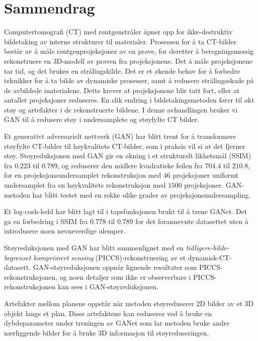 \chapter*{Sammendrag}
Computertomografi (CT) med røntgenstråler åpner opp for ikke-destruktiv bildetaking av interne strukturer til materialer. Prosessen for å ta CT-bilder består av å måle røntgenprojeksjoner av en prøve, for deretter å beregningsmessig rekonstruere en 3D-modell av prøven fra projeksjonene. Det å måle projeksjonene tar tid, og det brukes en strålingskilde. Det er et økende behov for å forbedre teknikker for å ta bilde av dynamiske prosesser, samt å redusere strålingsskade på de avbildede materialene. Dette krever at projeksjonene blir tatt fort, eller at antallet projeksjoner reduseres. En slik endring i bildetakingsmetoden fører til økt støy og artefakter i de rekonstruerte bildene. I denne avhandlingen bruker vi GAN til å redusere støy i undersamplete og støyfylte CT bilder. 

Et generativt adversarielt nettverk (GAN) har blitt trent for å transformere støyfylte CT-bilder til høykvalitets CT-bilder, som i praksis vil si at det fjerner støy. Støyreduksjonen med GAN gir en økning i et strukturelt likhetsmål (SSIM) fra $0.223$ til $0.789$, og reduserer den midlere kvadratiske feilen fra $704.4$ til $210.8$, for en projeksjonsundersamplet rekonstruksjon med $46$ projeksjoner uniformt undersamplet fra en høykvalitets rekonstruksjon med $1500$ projeksjoner. GAN-metoden har blitt testet med en rekke ulike grader av projeksjonsundersampling. 

Et log-cosh-ledd har blitt lagt til i tapsfunksjonen brukt til å trene GANet. Det ga en forbedring i SSIM fra $0.778$ til $0.789$ for det forannevnte datasettet uten å introdusere noen nevneverdige ulemper. 

Støyreduksjonen med GAN har blitt sammenlignet med en \textit{tidligere-bilde-begrenset komprimert sensing} (PICCS)-rekonstruering av et dynamisk-CT-datasett. GAN-støyreduksjonen oppnår lignende resultater som PICCS-rekonstruksjonen, og noen detaljer som ikke er observerbare i PICCS-rekonstruksjonen kan sees i GAN-støyreduksjonen. 

Artefakter mellom planene oppstår når metoden støyreduserer 2D bilder av et 3D objekt langs et plan. Disse artefaktene kan reduseres ved å bruke en dybdeparameter under treningen av GANet som lar metoden bruke andre nærliggende bilder for å bruke 3D informasjon til støyreduseringen. 